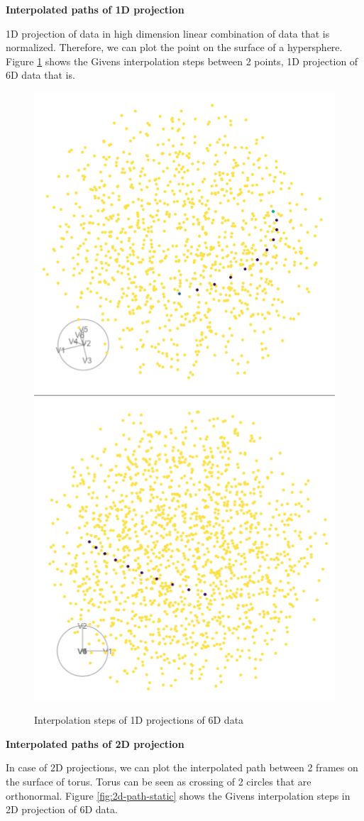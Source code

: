 \textbf{Interpolated paths of 1D projection}

1D projection of data in high dimension linear combination of data that
is normalized. Therefore, we can plot the point on the surface of a
hypersphere. Figure \ref{fig:1d-path-static} shows the Givens
interpolation steps between 2 points, 1D projection of 6D data that is.

\begin{Schunk}
\begin{figure}

{\centering \includegraphics[width=0.5\linewidth]{sphere_static} \includegraphics[width=0.5\linewidth]{torus_static} 

}

\caption[Interpolation steps of 1D projections of 6D data]{Interpolation steps of 1D projections of 6D data}\label{fig:1d-path-static}
\end{figure}
\end{Schunk}

\textbf{Interpolated paths of 2D projection}

In case of 2D projections, we can plot the interpolated path between 2
frames on the surface of torus. Torus can be seen as crossing of 2
circles that are orthonormal. Figure \ref{fig:2d-path-static} shows the
Givens interpolation steps in 2D projection of 6D data.

